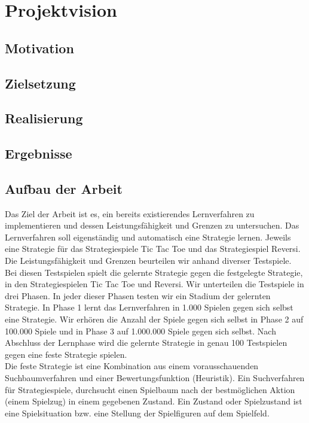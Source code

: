 \chapter{Projektvision}
\label{cha:projektvision}

\section{Motivation}

\section{Zielsetzung}

\section{Realisierung}

\section{Ergebnisse}

\section{Aufbau der Arbeit}


Das Ziel der Arbeit ist es, ein bereits existierendes Lernverfahren zu implementieren und dessen Leistungsfähigkeit und Grenzen zu untersuchen. Das Lernverfahren soll eigenständig und automatisch eine Strategie lernen. Jeweils eine Strategie für das Strategiespiele Tic Tac Toe und das Strategiespiel Reversi. \\  

Die Leistungsfähigkeit und Grenzen beurteilen wir anhand diverser Testspiele. Bei diesen Testspielen spielt die gelernte Strategie gegen die festgelegte Strategie, in den Strategiespielen Tic Tac Toe und Reversi. Wir unterteilen die Testspiele in drei Phasen. In jeder dieser Phasen testen wir ein Stadium der gelernten Strategie. In Phase 1 lernt das Lernverfahren in 1.000 Spielen gegen sich selbst eine Strategie. Wir erhören die Anzahl der Spiele gegen sich selbst in Phase 2 auf 100.000 Spiele und in Phase 3 auf 1.000.000 Spiele gegen sich selbst. Nach Abschluss der Lernphase wird die gelernte Strategie in genau 100 Testspielen gegen eine feste Strategie spielen. \\

Die feste Strategie ist eine Kombination aus einem vorausschauenden Suchbaumverfahren und einer Bewertungsfunktion (Heuristik). Ein Suchverfahren für Strategiespiele, durchsucht einen Spielbaum nach der bestmöglichen Aktion (einem Spielzug) in einem gegebenen Zustand. Ein Zustand oder Spielzustand ist eine Spielsituation bzw. eine Stellung der Spielfiguren auf dem Spielfeld. \\

